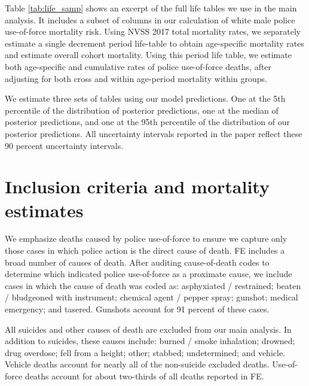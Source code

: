 \documentclass[9pt,twoside,lineno]{pnas-new}
\begin{document}


Table \ref{tab:life_samp} shows an excerpt of the full life tables we use in the main analysis. It includes a subset of columns in our calculation of white male police use-of-force mortality risk. Using NVSS 2017 total mortality rates, we separately estimate a single decrement period life-table to obtain age-specific mortality rates and estimate overall cohort mortality. Using this period life table, we estimate both age-specific and cumulative rates of police use-of-force deaths, after adjusting for both cross and within age-period mortality within groups. 

We estimate three sets of tables using our model predictions. One at the 5th percentile of the distribution of posterior predictions, one at the median of posterior predictions, and one at the 95th percentile of the distribution of our posterior predictions. All uncertainty intervals reported in the paper reflect these 90 percent uncertainty intervals. 

\section*{Inclusion criteria and mortality estimates}

We emphasize deaths caused by police use-of-force to ensure we capture only those cases in which police action is the direct cause of death. FE includes a broad number of causes of death. After auditing cause-of-death codes to determine which indicated police use-of-force as a proximate cause, we include cases in which the cause of death was coded as: asphyxiated / restrained; beaten / bludgeoned with instrument; chemical agent / pepper spray; gunshot; medical emergency; and tasered. Gunshots account for 91 percent of these cases.

All suicides and other causes of death are excluded from our main analysis. In addition to suicides, these causes include: burned / smoke inhalation; drowned; drug overdose; fell from a height; other; stabbed; undetermined; and vehicle. Vehicle deaths account for nearly all of the non-suicide excluded deaths. Use-of-force deaths account for about two-thirds of all deaths reported in FE. 
\end{document}
